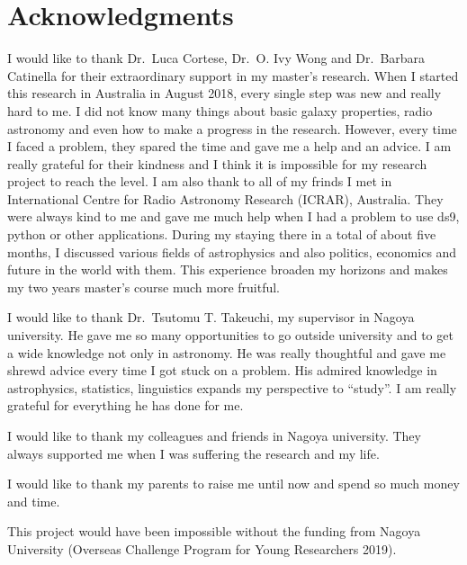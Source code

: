 \chapter*{\Large Acknowledgments}

I would like to thank Dr.\ Luca Cortese, Dr.\ O. Ivy Wong and Dr.\ Barbara Catinella for their extraordinary support in my master's research.
When I started this research in Australia in August 2018, every single step was new and really hard to me.
I did not know many things about basic galaxy properties, radio astronomy and even how to make a progress in the research.
However, every time I faced a problem, they spared the time and gave me a help and an advice.
I am really grateful for their kindness and I think it is impossible for my research project to reach the level.
I am also thank to all of my frinds I met in International Centre for Radio Astronomy Research (ICRAR), Australia.
They were always kind to me and gave me much help when I had a problem to use ds9, python or other applications.
During my staying there in a total of about five months, I discussed various fields of astrophysics and also politics, economics and future in the world with them.
This experience broaden my horizons and makes my two years master's course much more fruitful.

I would like to thank Dr.\ Tsutomu T. Takeuchi, my supervisor in Nagoya university.
He gave me so many opportunities to go outside university and to get a wide knowledge not only in astronomy.
He was really thoughtful and gave me shrewd advice every time I got stuck on a problem.
His admired knowledge in astrophysics, statistics, linguistics expands my perspective to ``study''.
I am really grateful for everything he has done for me.

I would like to thank my colleagues and friends in Nagoya university.
They always supported me when I was suffering the research and my life.

I would like to thank my parents to raise me until now and spend so much money and time.

This project would have been impossible without the funding from Nagoya University (Overseas Challenge Program for Young Researchers 2019).

